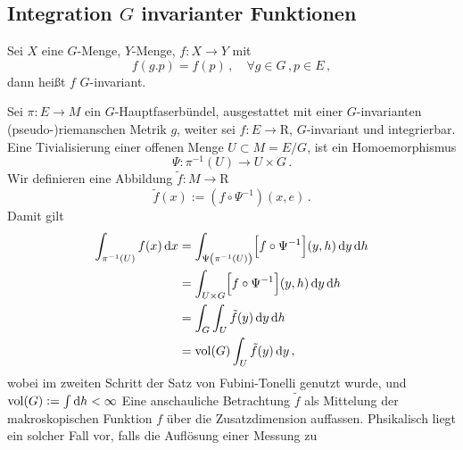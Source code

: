\subsection[Integration inv Fkt]{Integration $G$ invarianter Funktionen}
\begin{definition}
Sei $X$ eine $G$-Menge, $Y$-Menge, $f:X\to Y$ mit
\begin{equation}
f(g.p)=f(p)\,,\quad \forall g\in G\,,p\in E\,,
\end{equation}
dann heißt $f$ $G$-invariant.
\end{definition}
Sei $\pi: E\to M$ ein $G$-Hauptfaserbündel, ausgestattet mit einer
$G$-invarianten (pseudo-)riemanschen Metrik $g$, weiter sei
$f:E\to \mathrm{R}$, $G$-invariant und integrierbar. Eine Tivialisierung einer
offenen Menge $U\subset M=E/G$, ist ein Homoemorphismus
\begin{equation}
\Psi:\pi^{-1}(U)\to U\times G\,.
\end{equation}
Wir definieren eine Abbildung $\tilde{f}: M\to\mathrm{R}$
\begin{equation}
\tilde{f}\left(x\right):=\left(f\circ \Psi^{-1}\right)(x,e)\,.
\end{equation}
Damit gilt
\begin{equation}
\begin{split}
\int_{\pi^{-1}(U)}f(x)\dif x&=
\int_{\Psi\left(\pi^{-1}(U)\right)}\left[f\circ\Psi^{-1}\right](y,h)\dif y
\dif h\\
&=
\int_{U\times G}\left[f\circ\Psi^{-1}\right](y,h)\dif y
\dif h\\
&=\int_G\int_{U}\tilde{f}\left(y\right)\dif y
\dif h\\
&=\vol (G)\int_{U}\tilde{f}\left(y\right)\dif y\,,\label{eq:Intprod}
\end{split}
\end{equation}
wobei im zweiten Schritt der Satz von Fubini-Tonelli genutzt wurde, und
$\vol(G):=\int\dif h<\infty$ Eine anschauliche Betrachtung $\tilde{f}$ als
Mittelung der makroskopischen Funktion $f$ über die Zusatzdimension auffassen.
Phsikalisch liegt ein solcher Fall vor, falls die Auflösung einer Messung zu
